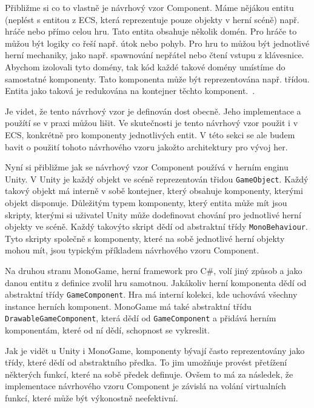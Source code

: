 Přibližme si co to vlastně je návrhový vzor Component. Máme nějákou entitu (neplést s entitou z ECS, která reprezentuje pouze objekty v herní scéně) např. hráče nebo přímo celou hru. Tato entita obsahuje několik domén. Pro hráče to můžou být logiky co řeší např. útok nebo pohyb. Pro hru to můžou být jednotlivé herní mechaniky, jako např. spawnování nepřátel nebo čtení vstupu z klávesnice. Abychom izolovali tyto domény, tak kód každé takové domény umístíme do samostatné komponenty. Tato komponenta může být reprezentována např. třídou. Entita jako taková je redukována na kontejner těchto komponent.~\cite{nystrom2014game}.


Je videt, že tento návrhový vzor je definován dost obecně. Jeho implementace a použítí se v praxi můžou lišit. Ve skutečnosti je tento návrhový vzor použit i v ECS, konkrétně pro komponenty jednotlivých entit. V této sekci se ale budem bavit o použití tohoto návrhového vzoru jakožto architektury pro vývoj her.

Nyní si přibližme jak se návrhový vzor Component používá v herním enginu Unity. V Unity je každý objekt ve scéně reprezentován třidou \verb|GameObject|. Každý takový objekt má interně v sobě kontejner, který obsahuje komponenty, kterými objekt disponuje. Důležitým typem komponenty, který entita může mít jsou skripty, kterými si uživatel Unity může dodefinovat chování pro jednotlivé herní objekty ve scéně. Každý takovýto skript dědí od abstraktní třídy \verb|MonoBehaviour|. Tyto skripty společně s komponenty, které na sobě jednotlivé herní objekty mohou mít, jsou typickým příkladem návrhového vzoru Component.

Na druhou stranu MonoGame, herní framework pro C\#, volí jiný způsob a jako danou entitu z definice zvolil hru samotnou. Jakákoliv herní komponenta dědí od abstraktní třídy \verb|GameComponent|. Hra má interní kolekci, kde uchovává všechny instance herních komponent. MonoGame má také abstraktní třídu \verb|DrawableGameComponent|, která dědí od \verb|GameComponent| a přidává herním komponentám, které od ní dědí, schopnost se vykreslit.

Jak je vidět u Unity i MonoGame, komponenty bývají často reprezentovány jako třídy, které dědí od abstraktního předka. To jim umožňuje provést přetížení některých funkcí, které na sobě předek definuje. Ovšem to má za následek, že implementace návrhového vzoru Component je závislá na volání virtualních funkcí, které může být výkonostně neefektivní.

